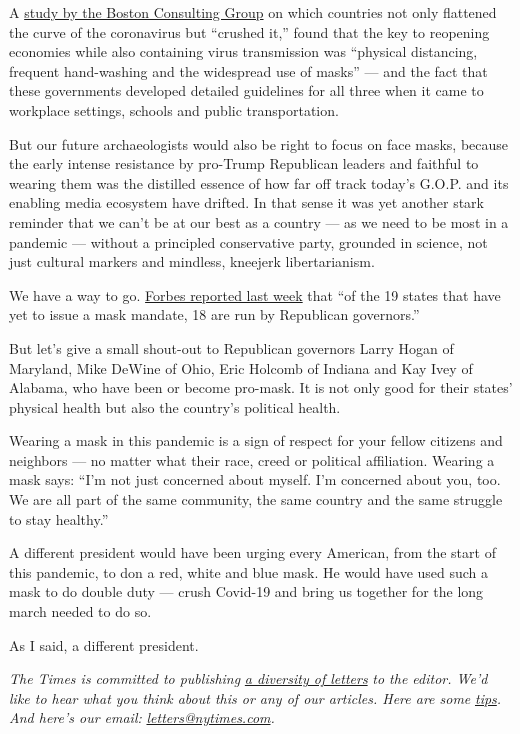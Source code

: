 A
\href{https://www.bcg.com/publications/2020/why-its-not-too-late-to-contain-the-virus}{study
by the Boston Consulting Group} on which countries not only flattened
the curve of the coronavirus but ``crushed it,'' found that the key to
reopening economies while also containing virus transmission was
``physical distancing, frequent hand-washing and the widespread use of
masks'' --- and the fact that these governments developed detailed
guidelines for all three when it came to workplace settings, schools and
public transportation.

But our future archaeologists would also be right to focus on face
masks, because the early intense resistance by pro-Trump Republican
leaders and faithful to wearing them was the distilled essence of how
far off track today's G.O.P. and its enabling media ecosystem have
drifted. In that sense it was yet another stark reminder that we can't
be at our best as a country --- as we need to be most in a pandemic ---
without a principled conservative party, grounded in science, not just
cultural markers and mindless, kneejerk libertarianism.

We have a way to go.
\href{https://www.forbes.com/sites/jackbrewster/2020/07/24/19-states-still-dont-mandate-masks-18-are-run-by-republican-governors/\#37bbd2e16243}{Forbes
reported last week} that ``of the 19 states that have yet to issue a
mask mandate, 18 are run by Republican governors.''

But let's give a small shout-out to Republican governors Larry Hogan of
Maryland, Mike DeWine of Ohio, Eric Holcomb of Indiana and Kay Ivey of
Alabama, who have been or become pro-mask. It is not only good for their
states' physical health but also the country's political health.

Wearing a mask in this pandemic is a sign of respect for your fellow
citizens and neighbors --- no matter what their race, creed or political
affiliation. Wearing a mask says: ``I'm not just concerned about myself.
I'm concerned about you, too. We are all part of the same community, the
same country and the same struggle to stay healthy.''

A different president would have been urging every American, from the
start of this pandemic, to don a red, white and blue mask. He would have
used such a mask to do double duty --- crush Covid-19 and bring us
together for the long march needed to do so.

As I said, a different president.

\emph{The Times is committed to publishing}
\href{https://www.nytimes.com/2019/01/31/opinion/letters/letters-to-editor-new-york-times-women.html}{\emph{a
diversity of letters}} \emph{to the editor. We'd like to hear what you
think about this or any of our articles. Here are some}
\href{https://help.nytimes.com/hc/en-us/articles/115014925288-How-to-submit-a-letter-to-the-editor}{\emph{tips}}\emph{.
And here's our email:}
\href{mailto:letters@nytimes.com}{\emph{letters@nytimes.com}}\emph{.}

